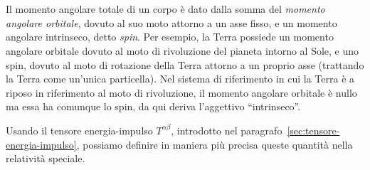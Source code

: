 \chapter{}
\label{cha:spin}

Il momento angolare totale di un corpo è dato dalla somma del
\emph{momento angolare orbitale}, dovuto al suo moto attorno a un asse fisso, e
un momento angolare intrinseco, detto \emph{spin}.  Per esempio, la Terra
possiede un momento angolare orbitale dovuto al moto di rivoluzione del pianeta
intorno al Sole, e uno spin, dovuto al moto di rotazione della Terra attorno a
un proprio asse (trattando la Terra come un'unica particella).  Nel sistema di
riferimento in cui la Terra è a riposo in riferimento al moto di rivoluzione, il
momento angolare orbitale è nullo ma essa ha comunque lo spin, da qui deriva
l'aggettivo ``intrinseco''.

Usando il tensore energia-impulso $T^{\alpha\beta}$, introdotto nel
paragrafo~\ref{sec:tensore-energia-impulso}, possiamo definire in maniera più
precisa queste quantità nella relatività speciale.

